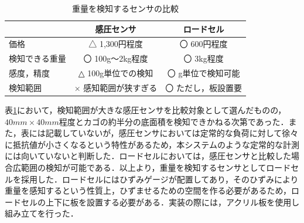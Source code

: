 \begin{table}[htb]
\begin{center}
\caption{重量を検知するセンサの比較}
\begin{tabular}{|l|c|c|} \hline
 & 感圧センサ & ロードセル \\ \hline \hline
価格 & △ 1,300円程度 & 〇 600円程度 \\
検知できる重量 & 〇 100g～2kg程度  & 〇 3kg程度 \\ 
感度，精度 & △ 100g単位での検知 & 〇 g単位で検知可能 \\
検知範囲 & × 感知範囲が狭すぎる & 〇 ただし，板設置要 \\ \hline
\end{tabular}
\label{rodo}
\end{center}
\end{table}


表\ref{rodo}において，検知範囲が大きな感圧センサを比較対象として選んだものの，$40mm\times40mm$程度とカゴの約半分の底面積を検知できかねる次第であった．また，表には記載していないが，感圧センサにおいては定常的な負荷に対して徐々に抵抗値が小さくなるという特性があるため，本システムのような定常的な計測には向いていないと判断した．ロードセルにおいては，感圧センサと比較した場合広範囲の検知が可能である．以上より，重量を検知するセンサとしてロードセルを採用した．ロードセルにはひずみゲージが配置してあり，そのひずみにより重量を感知するという性質上，ひずませるための空間を作る必要があるため，ロードセルの上下に板を設置する必要がある．実装の際には，アクリル板を使用し組み立てを行った．